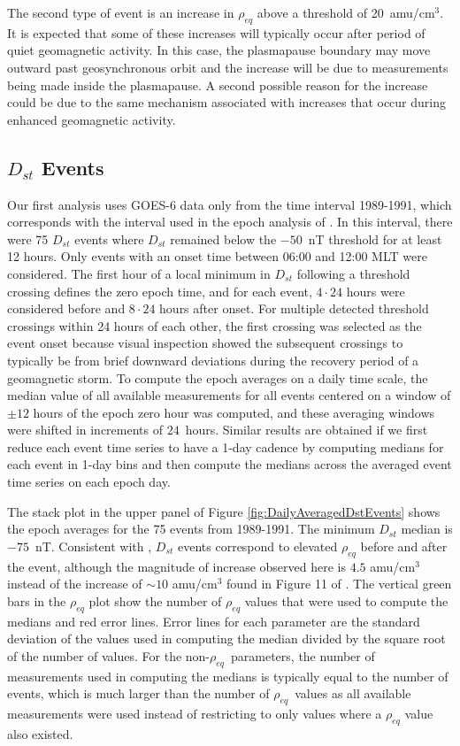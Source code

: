\documentclass[12pt]{article}
\begin{document}
The second type of event is an increase in $\rho_{eq}$ above a threshold of 20~amu/cm$^3$.  It is expected that some of these increases will typically occur after period of quiet geomagnetic activity.  In this case, the plasmapause boundary may move outward past geosynchronous orbit and the increase will be due to measurements being made inside the plasmapause.  A second possible reason for the increase could be due to the same mechanism associated with increases that occur during enhanced geomagnetic activity.

\subsection{$D_{st}$ Events}

Our first analysis uses GOES-6 data only from the time interval 1989-1991, which corresponds with the interval used in the epoch analysis of \cite{Takahashi2010}. In this interval, there were 75 $D_{st}$ events where $D_{st}$ remained below the $-50$~nT threshold for at least 12 hours. Only events with an onset time between 06:00 and 12:00 MLT were considered. The first hour of a local minimum in $D_{st}$ following a threshold crossing defines the zero epoch time, and for each event, $4\cdot24$ hours were considered before and $8\cdot24$ hours after onset. For multiple detected threshold crossings within 24 hours of each other, the first crossing was selected as the event onset because visual inspection showed the subsequent crossings to typically be from brief downward deviations during the recovery period of a geomagnetic storm. To compute the epoch averages on a daily time scale, the median value of all available measurements for all events centered on a window of $\pm 12$ hours of the epoch zero hour was computed, and these averaging windows were shifted in increments of $24$~hours. Similar results are obtained if we first reduce each event time series to have a 1-day cadence by computing medians for each event in 1-day bins and then compute the medians across the averaged event time series on each epoch day. 

The stack plot in the upper panel of Figure \ref{fig:DailyAveragedDstEvents} shows the epoch averages for the 75 events from 1989-1991.  The minimum $D_{st}$ median is $-75$~nT.  Consistent with \cite{Takahashi2010}, $D_{st}$ events correspond to elevated $\rho_{eq}$ before and after the event, although the magnitude of increase observed here is $4.5$ amu/cm$^3$ instead of the increase of ${\sim} 10$ amu/cm$^3$ found in Figure 11 of \cite{Takahashi2010}.  The vertical green bars in the $\rho_{eq}$ plot show the number of $\rho_{eq}$ values that were used to compute the medians and red error lines.  Error lines for each parameter are the standard deviation of the values used in computing the median divided by the square root of the number of values. For the non-$\rho_{eq}$\ parameters, the number of measurements used in computing the medians is typically equal to the number of events, which is much larger than the number of $\rho_{eq}$\ values as all available measurements were used instead of restricting to only values where a $\rho_{eq}$ value also existed.
\end{document}
